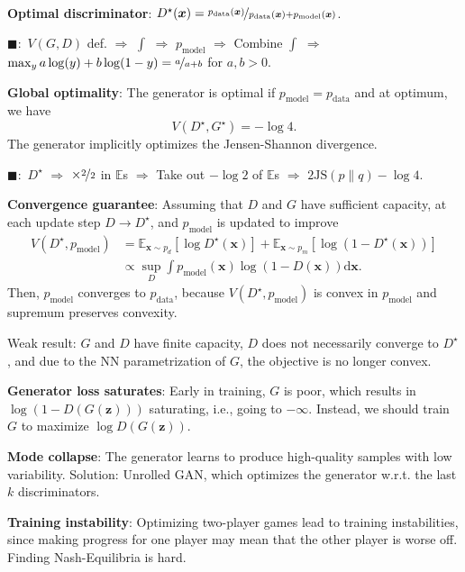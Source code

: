 \documentclass{article}
\newcommand{\E}{\mathbb{E}}
\renewcommand{\vec}[1]{\bm{#1}}
\newenvironment{topic}[1]
{\textbf{\sffamily \colorbox{black}{\rlap{\textbf{\textcolor{white}{#1}}}\hspace{\linewidth}\hspace{-2\fboxsep}}} \\ \vspace{0.2cm}}
{}
\begin{document}
\begin{multicols*}{2}
\begin{topic}{Generative adversarial network}
        \textbf{Optimal discriminator}: $D^\star(\vec{x}) = \nicefrac{p_{\mathrm{data}}(\vec{x})}{p_{\mathrm{data}}(\vec{x}) + p_{\mathrm{model}}(\vec{x})}$.

        $\blacksquare:$ $V(G,D)$ def. $\Rightarrow$ $\int$ $\Rightarrow$ $p_{\mathrm{model}}$ $\Rightarrow$ Combine $\int$ $\Rightarrow$ $\max_y a \log(y) + b \log(1-y) = \nicefrac{a}{a+b}$ for $a,b > 0$.

        \textbf{Global optimality}: The generator is optimal if $p_{\mathrm{model}} = p_{\mathrm{data}}$ and at optimum, we have \[
            V(D^\star, G^\star) = -\log 4.
        \]
        The generator implicitly optimizes the Jensen-Shannon divergence.

        $\blacksquare:$ $D^\star$ $\Rightarrow$ $\times \nicefrac{2}{2}$ in $\E$s $\Rightarrow$ Take
        out $-\log 2$ of $\E$s $\Rightarrow$ $2 \mathrm{JS}(p \| q) - \log 4$.

        \textbf{Convergence guarantee}: Assuming that $D$ and $G$ have sufficient capacity, at each update step $D \to D^\star$, and $p_{\mathrm{model}}$ is updated to improve
        \begin{align*}
            V(D^\star, p_{\mathrm{model}}) & = \E_{\vec{x} \sim p_d} [\log D^\star(\vec{x})] + \E_{\vec{x} \sim p_m} [\log (1 - D^\star(\vec{x}))] \\
                                           & \propto \sup_D \int p_{\mathrm{model}}(\vec{x}) \log (1 - D(\vec{x})) \mathrm{d}\vec{x}.
        \end{align*}
        Then, $p_{\mathrm{model}}$ converges to $p_{\mathrm{data}}$, because $V(D^\star,
            p_{\mathrm{model}})$ is convex in $p_{\mathrm{model}}$ and supremum preserves convexity.

        Weak result: $G$ and $D$ have finite capacity, $D$ does not necessarily converge to $D^\star$, and
        due to the NN parametrization of $G$, the objective is no longer convex.

        \textbf{Generator loss saturates}: Early in training, $G$ is poor, which results in $\log (1
            - D(G(\vec{z})))$ saturating, i.e., going to $-\infty$. Instead, we should train $G$ to
        maximize $\log D(G(\vec{z}))$.

        \textbf{Mode collapse}: The generator learns to produce high-quality samples with low
        variability. Solution: Unrolled GAN, which optimizes the generator w.r.t. the last $k$
        discriminators.

        \textbf{Training instability}: Optimizing two-player games lead to training instabilities,
        since making progress for one player may mean that the other player is worse off. Finding
        Nash-Equilibria is hard.


\end{topic}
\end{multicols*}
\end{document}

